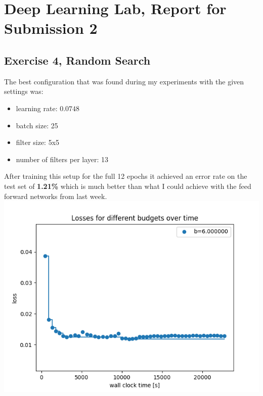 \documentclass{scrartcl}
\begin{document}
\section*{Deep Learning Lab, Report for Submission 2}

\subsection*{Exercise 4, Random Search}
The best configuration that was found during my experiments with the given settings was:
\begin{itemize}
	\item learning rate: $0.0748$
	\item batch size: 25
	\item filter size: 5x5
	\item number of filters per layer: 13
\end{itemize}
After training this setup for the full 12 epochs it achieved an error rate on the test set of \textbf{1.21\%} which is much better than what I could achieve with the feed forward networks from last week. \\
\includegraphics[scale=0.7]{random_result.png}
\end{document}
